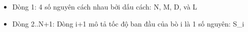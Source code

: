 \begin{itemize}
	\item     Dòng 1: 4 số nguyên cách nhau bởi dấu cách: N, M, D, và L   
	\item     Dòng 2..N+1: Dòng i+1 mô tả tốc độ ban đầu của bò i là 1 số nguyên: S\_i   
\end{itemize}

\